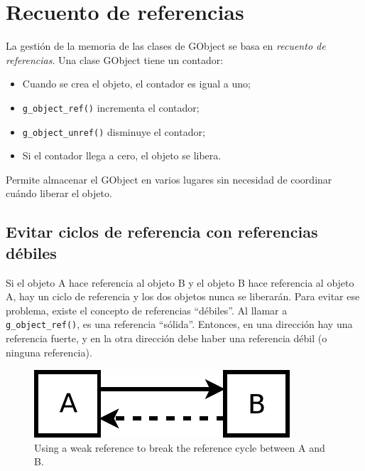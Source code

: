 \section{Recuento de referencias}

La gestión de la memoria de las clases de GObject se basa en \emph{recuento de referencias}. Una clase GObject tiene un contador:
\begin{itemize}
    \item Cuando se crea el objeto, el contador es igual a uno;
    \item \lstinline{g_object_ref()} incrementa el contador;
    \item \lstinline{g_object_unref()} disminuye el contador;
    \item Si el contador llega a cero, el objeto se libera.
\end{itemize}

Permite almacenar el GObject en varios lugares sin necesidad de coordinar cuándo liberar el objeto.

\subsection{Evitar ciclos de referencia con referencias débiles}

Si el objeto A hace referencia al objeto B y el objeto B hace referencia al objeto A, hay un ciclo de referencia y los dos objetos nunca se liberarán. Para evitar ese problema, existe el concepto de referencias ``débiles''. Al llamar a \lstinline{g_object_ref()}, es una referencia ``sólida''. Entonces, en una dirección hay una referencia fuerte, y en la otra dirección debe haber una referencia débil (o ninguna referencia).

\begin{figure}
  \begin{center}
    \includegraphics[scale=0.75]{imagenes/weak-ref.pdf}
    \caption{Using a weak reference to break the reference cycle between A and B.}
    \label{oop-gobject-weak-ref-schema}
  \end{center}
\end{figure}